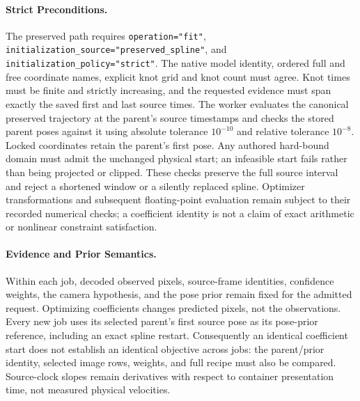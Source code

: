 \documentclass[11pt,letterpaper]{article}
\newcommand{\code}[1]{\nolinkurl{#1}}
\begin{document}
\paragraph{Strict Preconditions.}
The preserved path requires \code{operation="fit"},
\code{initialization_source="preserved_spline"}, and
\code{initialization_policy="strict"}. The native model identity, ordered
full and free coordinate names, explicit knot grid and knot count must agree.
Knot times must be finite and strictly increasing, and the requested evidence
must span exactly the saved first and last source times. The worker evaluates
the canonical preserved trajectory at the parent's source timestamps and
checks the stored parent poses against it using absolute tolerance $10^{-10}$
and relative tolerance $10^{-8}$. Locked coordinates retain the parent's
first pose. Any authored hard-bound domain must admit the unchanged physical
start; an infeasible start fails rather than being projected or clipped.
These checks preserve the full source interval and reject a shortened window
or a silently replaced spline. Optimizer transformations and subsequent
floating-point evaluation remain subject to their recorded numerical checks;
a coefficient identity is not a claim of exact arithmetic or nonlinear
constraint satisfaction.

\paragraph{Evidence and Prior Semantics.}
Within each job, decoded observed pixels, source-frame identities, confidence
weights, the camera hypothesis, and the pose prior remain fixed for the
admitted request. Optimizing coefficients changes predicted pixels, not the
observations. Every new job uses its selected parent's first source pose as
its pose-prior reference, including an exact spline restart. Consequently an
identical coefficient start does not establish an identical objective across
jobs: the parent/prior identity, selected image rows, weights, and full recipe
must also be compared. Source-clock slopes remain derivatives with respect
to container presentation time, not measured physical velocities.
\end{document}
